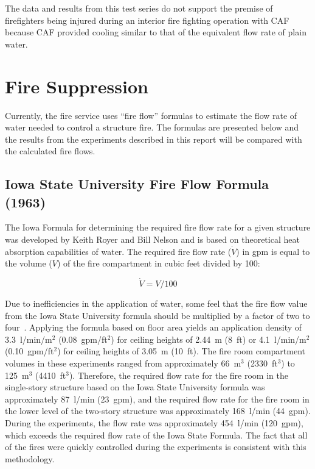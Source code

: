 \documentclass[12pt,oneside]{book}
\begin{document}
The data and results from this test series do not support the premise of firefighters being injured during an interior fire fighting operation with CAF because CAF provided cooling similar to that of the equivalent flow rate of plain water.

\section{Fire Suppression}
\label{sec:Fire_Suppression_discussion}

Currently, the fire service uses ``fire flow'' formulas to estimate the flow rate of water needed to control a structure fire. The formulas are presented below and the results from the experiments described in this report will be compared with the calculated fire flows.

\subsection{Iowa State University Fire Flow Formula (1963)}
The Iowa Formula for determining the required fire flow rate for a given structure was developed by Keith Royer and Bill Nelson and is based on theoretical heat absorption capabilities of water. The required fire flow rate ($\dot{V}$) in gpm is equal to the volume ($V$) of the fire compartment in cubic feet divided by 100:

\begin{equation}\label{eq:isu_form}
\dot{V} = V / 100
\end{equation}

Due to inefficiencies in the application of water, some feel that the fire flow value from the Iowa State University formula should be multiplied by a factor of two to four~\cite{NFPA}. Applying the formula based on floor area yields an application density of 3.3~l/min/m$^2$ (0.08~gpm/ft$^2$) for ceiling heights of 2.44~m (8~ft) or 4.1~l/min/m$^2$ (0.10~gpm/ft$^2$) for ceiling heights of 3.05~m (10~ft). The fire room compartment volumes in these experiments ranged from approximately 66~m$^3$ (2330~ft$^3$) to 125~m$^3$ (4410~ft$^3$). Therefore, the required flow rate for the fire room in the single-story structure based on the Iowa State University formula was approximately 87~l/min (23~gpm), and the required flow rate for the fire room in the lower level of the two-story structure was approximately 168~l/min (44~gpm). During the experiments, the flow rate was approximately 454~l/min (120~gpm), which exceeds the required flow rate of the Iowa State Formula. The fact that all of the fires were quickly controlled during the experiments is consistent with this methodology. 
\end{document}
